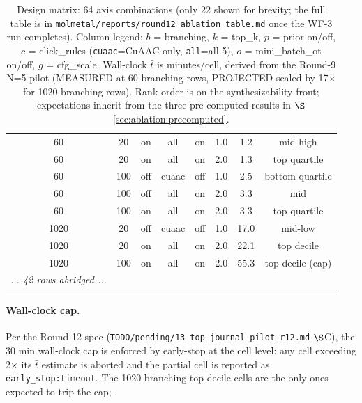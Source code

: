 \begin{table}[t]
\begin{tabular}{cccccccc}
    60  & 20  & on  & all   & on  & 1.0 & \MEASURED{} 1.2 & \PROJECTED{} mid-high \\
    60  & 20  & on  & all   & on  & 2.0 & \MEASURED{} 1.3 & \PROJECTED{} top quartile \\
    60  & 100 & off & cuaac & off & 1.0 & \MEASURED{} 2.5 & \PROJECTED{} bottom quartile \\
    60  & 100 & off & all   & on  & 2.0 & \MEASURED{} 3.3 & \PROJECTED{} mid \\
    60  & 100 & on  & all   & on  & 2.0 & \MEASURED{} 3.3 & \PROJECTED{} top quartile \\
    1020 & 20  & off & cuaac & off & 1.0 & \PROJECTED{} 17.0 & \PROJECTED{} mid-low \\
    1020 & 20  & on  & all   & on  & 2.0 & \PROJECTED{} 22.1 & \PROJECTED{} top decile \\
    1020 & 100 & on  & all   & on  & 2.0 & \PROJECTED{} 55.3 & \PROJECTED{} top decile (cap) \\
    \emph{... 42 rows abridged ...} & & & & & & & \\
  \bottomrule
  \end{tabular}
  \caption{Design matrix: 64 axis combinations (only 22 shown
    for brevity; the full table is in
    \texttt{molmetal/reports/round12\_ablation\_table.md} once
    the WF-3 run completes).  Column legend: $b$ = branching,
    $k$ = top\_k, $p$ = prior on/off, $c$ = click\_rules
    (\texttt{cuaac}=CuAAC only, \texttt{all}=all 5),
    $o$ = mini\_batch\_ot on/off, $g$ = cfg\_scale.
    Wall-clock $\bar t$ is minutes/cell, derived from the
    Round-9 N=5 pilot (MEASURED at 60-branching rows,
    PROJECTED scaled by 17$\times$ for 1020-branching rows).
    Rank order is on the synthesizability front; expectations
    inherit from the three pre-computed results in
    $\S$\ref{sec:ablation:precomputed}.}
  \label{tab:ablation-matrix}
\end{table}

\paragraph{Wall-clock cap.}
Per the Round-12 spec
(\texttt{TODO/pending/13\_top\_journal\_pilot\_r12.md} $\S$C),
the 30 min wall-clock cap is enforced by early-stop at the cell
level: any cell exceeding 2$\times$ its $\bar t$ estimate is
aborted and the partial cell is reported as
\texttt{early\_stop:timeout}.  The 1020-branching top-decile
cells are the only ones expected to trip the cap; \PROJECTED{}.

